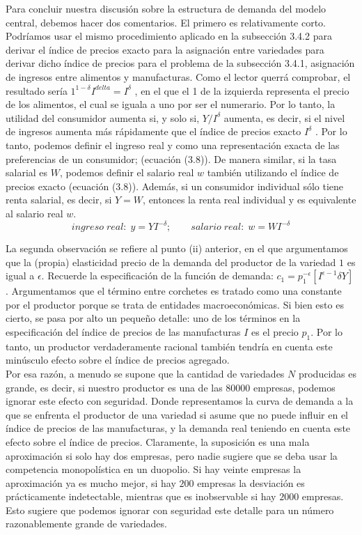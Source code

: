 Para concluir nuestra discusión sobre la estructura de demanda del modelo central, debemos hacer dos comentarios. El primero es relativamente corto. Podríamos usar el mismo procedimiento aplicado en la subsección 3.4.2 para derivar el índice de precios exacto para la asignación entre variedades para derivar dicho índice de precios para el problema de la subsección 3.4.1, asignación de ingresos entre alimentos y manufacturas. Como el lector querrá comprobar, el resultado sería $1^{1-\delta}I^{delta}=I^{\delta}$ , en el que el 1 de la izquierda representa el precio de los alimentos, el cual se iguala a uno por ser el numerario. Por lo tanto, la utilidad del consumidor aumenta si, y solo si, $Y/I^{\delta}$ aumenta, es decir, si el nivel de ingresos aumenta más rápidamente que el índice de precios exacto $I^{\delta}$ . Por lo tanto, podemos definir el ingreso real y como una representación exacta de las preferencias de un consumidor;  (ecuación (3.8)). De manera similar, si la tasa salarial es $W$, podemos definir el salario real $w$ también utilizando el índice de precios exacto (ecuación (3.8)). Además, si un consumidor individual sólo tiene renta salarial, es decir, si $Y = W$, entonces la renta real individual y es equivalente al salario real $w$.\\
    \begin{equation}
	ingreso\; real: \; y=YI^{-\delta};\qquad salario\; real: \; w=WI^{-\delta}
    \end{equation}

    La segunda observación se refiere al punto (ii) anterior, en el que argumentamos que la (propia) elasticidad precio de la demanda del productor de la variedad $1$ es igual a $\epsilon$. Recuerde la especificación de la función de demanda: $c_1 = p_1^{-\epsilon}[I^{\epsilon-1} \delta Y]$. Argumentamos que el término entre corchetes es tratado como una constante por el productor porque se trata de entidades macroeconómicas. Si bien esto es cierto, se pasa por alto un pequeño detalle: uno de los términos en la especificación del índice de precios de las manufacturas $I$ es el precio $p_1$. Por lo tanto, un productor verdaderamente racional también tendría en cuenta este minúsculo efecto sobre el índice de precios agregado.\\
Por esa razón, a menudo se supone que la cantidad de variedades $N$ producidas es grande, es decir, si nuestro productor es una de las $80 000$ empresas, podemos ignorar este efecto con seguridad. Donde representamos la curva de demanda a la que se enfrenta el productor de una variedad si asume que no puede influir en el índice de precios de las manufacturas, y la demanda real teniendo en cuenta este efecto sobre el índice de precios. Claramente, la suposición es una mala aproximación si solo hay dos empresas, pero nadie sugiere que se deba usar la competencia monopolística en un duopolio. Si hay veinte empresas la aproximación ya es mucho mejor, si hay $200$ empresas la desviación es prácticamente indetectable, mientras que es inobservable si hay $2000$ empresas. Esto sugiere que podemos ignorar con seguridad este detalle para un número razonablemente grande de variedades.


